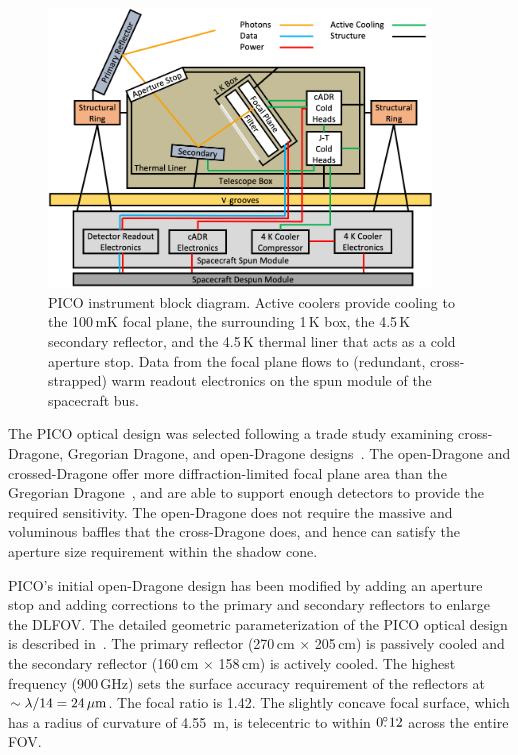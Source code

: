 \begin{figure}%
\parbox{4.0in}{
\includegraphics[width=4.0in]{images/ArchitectureBlockDiagram.png} }
\hspace{0.1in}
\parbox{2.3in}{
\caption{\captiontext
PICO instrument block diagram. Active coolers provide cooling to the 100\,mK focal plane, the surrounding 1\,K box, the 4.5\,K secondary reflector, and the 4.5\,K thermal liner that acts as a cold aperture stop. Data from the focal plane flows to (redundant, cross-strapped) warm readout electronics on the spun module of the spacecraft bus.
\label{fig:ArchitectureBlockDiagram} }  }
\end{figure}

The PICO optical design was selected following a trade study examining cross-Dragone, Gregorian Dragone, and open-Dragone designs~\citep{Young2018}.  The open-Dragone and crossed-Dragone offer more diffraction-limited focal plane area than the Gregorian Dragone~\citep{deBernardis2018}, and are able to support enough detectors to provide the required sensitivity. The open-Dragone does not require the massive and voluminous baffles that the cross-Dragone does, and hence can satisfy the aperture size requirement within the shadow cone.

PICO's initial open-Dragone design has been modified by adding an aperture stop and adding corrections to the primary and secondary reflectors to enlarge the DLFOV. The detailed geometric parameterization of the PICO optical design is described in~\citep{Young2018}. The primary reflector (270\,cm $\times$ 205\,cm) is passively cooled and the secondary reflector (160\,cm $\times$ 158\,cm) is actively cooled. The highest frequency (900\,GHz) sets the surface accuracy requirement of the reflectors at $\sim \lambda/14 =24\,\mu{\rm m}$. The focal ratio is 1.42. The slightly concave focal surface, which has a radius of curvature of 4.55~m, is telecentric to within $0.\!\!^\circ12$ across the entire FOV.

